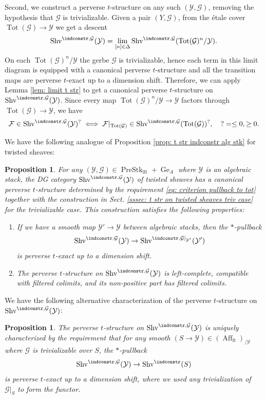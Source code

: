 \documentclass[10pt]{amsart}
\newtheorem{prop}[subsubsection]{Proposition}
\theoremstyle{remark}
\newcommand{\on}{\operatorname}
\newcommand{\cF}{\mathcal{F}}
\newcommand{\cG}{\mathcal{G}}
\newcommand{\cY}{\mathcal{Y}}
\newcommand{\Shv}{\on{Shv}}
\newcommand{\PreStklft}{\on{PreStk}_{\on{lft}}}
\newcommand{\Affft}{\on{Aff}_{\on{ft}}}
\begin{document}
Second, we construct a perverse $t$-structure on any such $(\cY,\cG)$, removing the hypothesis that $\cG$ is trivializable. Given a pair $(Y,\cG)$, from the \'etale cover $\on{Tot}(\cG)\rightarrow\cY$ we get a descent
\begin{equation}\label{eq: descent tw indconstr}
    \Shv^{\indconstr,\cG}(\cY) = \lim_{[n]\in\Delta}\Shv^{\indconstr, \cG}(\on{Tot}(\cG)^n/\cY).
\end{equation}
On each $\on{Tot}(\cG)^n/\cY$ the gerbe $\cG$ is trivializable, hence each term in this limit diagram is equipped with a canonical perverse $t$-structure and all the transition maps are perverse $t$-exact up to a dimension shift. Therefore, we can apply Lemma \ref{lem: limit t str} to get a canonical perverse $t$-structure on $\Shv^{\indconstr,\cG}(\cY)$. Since every map $\on{Tot}(\cG)^n/\cY\rightarrow \cY$ factors through $\on{Tot}(\cG)\rightarrow\cY$, we have
\begin{equation}\label{eq: criterion pullback to tot}
\cF\in \Shv^{\indconstr,\cG}(\cY)^{?} \iff \cF|_{\on{Tot}(\cG)}\in \Shv^{\indconstr,\cG}(\on{Tot}(\cG))^{?},\quad ?= \le 0, \ge 0.
\end{equation}

We have the following analogue of Proposition \ref{prop: t str indconstr alg stk} for twisted sheaves:
\begin{prop}\label{prop: t str twisted indconstr alg stk}
    For any $(\cY,\cG)\in\PreStklft+\on{Ge}_A$ where $\cY$ is an algebraic stack, the DG category $\Shv^{\indconstr,\cG}(\cY)$ of twisted sheaves has a canonical perverse $t$-structure determined by the requirement \eqref{eq: criterion pullback to tot} together with the construction in Sect. \ref{sssec: t str on twisted sheaves triv case} for the trivializable case. This construction satisfies the following properties:
    \begin{enumerate}
        \item If we have a smooth map $\cY'\rightarrow \cY$ between algebraic stacks, then the $*$-pullback
        \[\Shv^{\indconstr, \cG}(\cY)\rightarrow \Shv^{\indconstr, \cG|_{\cY'}}(\cY')\]
        is perverse $t$-exact up to a dimension shift.
        \item The perverse $t$-structure on $\Shv^{\indconstr,\cG}(\cY)$ is left-complete, compatible with filtered colimits, and its non-positive part has filtered colimits.
    \end{enumerate}
\end{prop}

We have the following alternative characterization of the perverse $t$-structure on $\Shv^{\indconstr,\cG}(\cY)$:
\begin{prop}
    The perverse $t$-structure on $\Shv^{\indconstr,\cG}(\cY)$ is uniquely characterized by the requirement that for any smooth $(S \rightarrow \cY)\in (\Affft)_{/\cY}$ where $\cG$ is trivializable over $S$, the $*$-pullback
    \[\Shv^{\indconstr,\cG}(\cY)\rightarrow \Shv^{\indconstr}(S)\]
    is perverse $t$-exact up to a dimension shift, where we used any trivialization of $\cG|_S$ to form the functor.
\end{prop}
\end{document}
